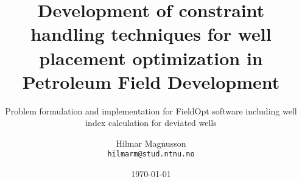 




%

\title{\textbf{Development of constraint handling 
techniques for well placement optimization in 
Petroleum Field Development}
}

\subtitle{Problem formulation and implementation for FieldOpt software including well index calculation for deviated wells}

\author{
Hilmar Magnusson\\
\texttt{hilmarm@stud.ntnu.no}
} 

\date{\today}



\frontmatter
\pagestyle{plain}

%



%
\renewcommand{\contentsname}
{Table of contents}
\tableofcontents
\setcounter{tocdepth}{3}
\clearpage


\newcommand{\mb}[1]{\btxt{#1}}
\newcommand{\hmm}[1]{\rtxt{#1}}

\mainmatter
\pagestyle{custom-fancy}
 \clearpage

 \clearpage


 \clearpage

